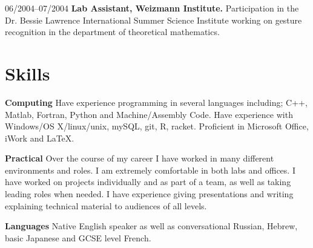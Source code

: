 \documentclass[a4paper]{article}
\begin{document}
\begin{CV}
\item[06/2004--07/2004] \textbf{Lab Assistant, Weizmann Institute.} Participation
in the Dr. Bessie Lawrence International Summer Science Institute working
on gesture recognition in the department of theoretical mathematics.

%


% 



\end{CV}

\pagebreak
\section{Skills}
\begin{CV}
\item[\textbf{Computing}] Have experience programming in several languages including; C++, Matlab, Fortran, Python and Machine/Assembly Code. Have
experience with Windows/OS X/linux/unix, mySQL, git, R, racket. Proficient in Microsoft Office, iWork and
\LaTeX. 
\item[\textbf{Practical}] Over the course of my career I have worked in many different environments and roles. I am extremely comfortable in both labs and offices. I have worked on projects individually and as part of a team, as well as taking leading roles when needed. I have experience giving presentations and writing explaining technical material to audiences of all levels.



\item[\textbf{Languages}] Native English speaker as well as conversational Russian, Hebrew, basic Japanese and GCSE level French.
\end{CV}
\end{document}
